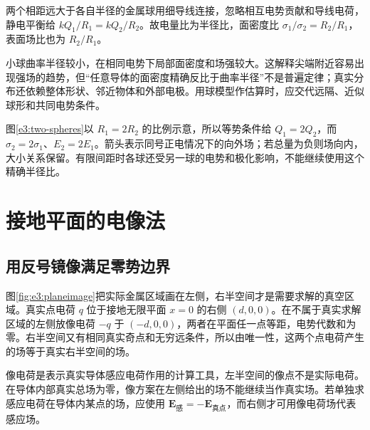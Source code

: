 两个相距远大于各自半径的金属球用细导线连接，忽略相互电势贡献和导线电荷，静电平衡给 $kQ_1/R_1=kQ_2/R_2$。故电量比为半径比，面密度比 $\sigma_1/\sigma_2=R_2/R_1$，表面场比也为 $R_2/R_1$。

小球曲率半径较小，在相同电势下局部面密度和场强较大。这解释尖端附近容易出现强场的趋势，但“任意导体的面密度精确反比于曲率半径”不是普遍定律；真实分布还依赖整体形状、邻近物体和外部电极。用球模型作估算时，应交代远隔、近似球形和共同电势条件。



图\ref{e3:two-spheres}以 $R_1=2R_2$ 的比例示意，所以等势条件给 $Q_1=2Q_2$，而 $\sigma_2=2\sigma_1$、$E_2=2E_1$。箭头表示同号正电情况下的向外场；若总量为负则场向内，大小关系保留。有限间距时各球还受另一球的电势和极化影响，不能继续使用这个精确半径比。

\section{接地平面的电像法}
\subsection{用反号镜像满足零势边界}

图\ref{fig:e3:planeimage}把实际金属区域画在左侧，右半空间才是需要求解的真空区域。真实点电荷 $q$ 位于接地无限平面 $x=0$ 的右侧 $(d,0,0)$。在不属于真实求解区域的左侧放像电荷 $-q$ 于 $(-d,0,0)$，两者在平面任一点等距，电势代数和为零。右半空间又有相同真实奇点和无穷远条件，所以由唯一性，这两个点电荷产生的场等于真实右半空间的场。

像电荷是表示真实导体感应电荷作用的计算工具，左半空间的像点不是实际电荷。在导体内部真实总场为零，像方案在左侧给出的场不能继续当作真实场。若单独求感应电荷在导体内某点的场，应使用 $\bm E_{\text{感}}=-\bm E_{\text{真点}}$，而右侧才可用像电荷场代表感应场。

